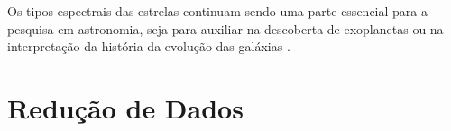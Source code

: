 Os tipos espectrais das estrelas continuam sendo uma parte essencial para a pesquisa em astronomia, seja para auxiliar na descoberta de exoplanetas ou na interpretação da história da evolução das galáxias \citep{Charbonneau_2002}. 



\section{Redução de Dados}\label{data-reduction}


